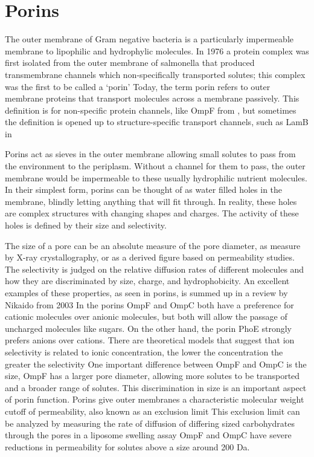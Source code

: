   \section{Porins} \label{sec:intro-porins}   
 
The outer membrane of Gram negative bacteria is a particularly impermeable membrane to lipophilic and hydrophylic molecules. In 1976 a protein complex was first isolated from the outer membrane of \ac{salmonella} that produced transmembrane channels which non-specifically transported solutes; this complex was the first to be called a `porin' Today, the term porin refers to outer membrane proteins that transport molecules across a membrane passively. This definition is for non-specific protein channels, like OmpF from \ecoli{}, but sometimes the definition is opened up to structure-specific transport channels, such as LamB in \ecoli{} 

Porins act as sieves in the outer membrane allowing small solutes to pass from the environment to the periplasm. Without a channel for them to pass, the outer membrane would be impermeable to these usually hydrophilic nutrient molecules. In their simplest form, porins can be thought of as water filled holes in the membrane, blindly letting anything that will fit through. In reality, these holes are complex structures with changing shapes and charges. The activity of these holes is defined by their size and selectivity.

The size of a pore can be an absolute measure of the pore diameter, as measure
by X-ray crystallography, or as a derived figure based on permeability studies.
The selectivity is judged on the relative diffusion rates of different molecules
and how they are discriminated by size, charge, and hydrophobicity. An excellent
examples of these properties, as seen in \ecoli{} porins, is summed up in a
review by Nikaido from 2003 In \ecoli{} the
porins OmpF and OmpC both have a preference for cationic molecules over anionic
molecules, but both will allow the passage of uncharged molecules like sugars.
On the other hand, the \ecoli{} porin PhoE strongly prefers anions over cations.
There are theoretical models that suggest that ion selectivity is related to
ionic concentration, the lower the concentration the greater the
selectivity One important difference between OmpF and OmpC
is the size, OmpF has a larger pore diameter, allowing more solutes to be
transported and a broader range of solutes. This discrimination in size is an
important aspect of porin function. Porins give outer membranes a characteristic
molecular weight cutoff of permeability, also known as an exclusion
limit This exclusion limit can be analyzed by
measuring the rate of diffusion of differing sized carbohydrates through the
pores in a liposome swelling assay OmpF and OmpC
have severe reductions in permeability for solutes above a size around 200 Da.
 
